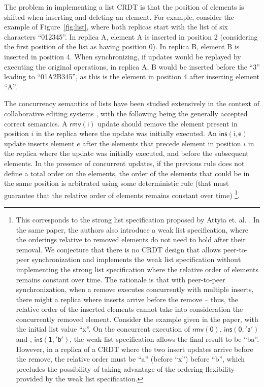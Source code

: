 \documentclass[11pt,a4paper]{article}
\begin{document}
The problem in implementing a list CRDT \cite{Preguica09Commutative,Weiss09Logoot,Roh11Replicated} 
is that the position of elements
is shifted when inserting and deleting an element. For example, consider the example of 
Figure~\ref{fig:list}, where both replicas start with the list of six 
characters ``012345''.
In replica A, element A is inserted in position 2 (considering the first position of 
the list as having position 0).
In replica B, element B is inserted in position 4. 
When synchronizing, if updates would be replayed by executing the original operations, 
in replica A, B would be inserted before the ``3'' leading to ``01A2B345'', as this is 
the element in position 4 after inserting element ``A''. 

The concurrency semantics of lists have been studied extensively in the context of 
collaborative editing systems \cite{Sun98Operational}, with the following being 
the generally accepted correct semantics. 
A $\mathsf{rmv(i)}$ update should remove the element present in position $i$ in 
the replica where the update was initially executed.
An $\mathsf{ins(i,e)}$ update inserts element $e$ after the elements that precede 
element in position $i$ in the replica where the update was initially executed, 
and before the subsequent elements.
In the presence of concurrent updates, if the previous rule does not define a total
order on the elements, the order of the elements that could be in the same position
is arbitrated using some deterministic rule (that must guarantee that the relative 
order of elements remains constant over time) \footnote{This corresponds to the
strong list specification proposed by Attyia et. al. \cite{Attiya16Specification}. 
In the same paper, the authors also introduce a weak list specification, where the 
orderings relative to removed elements do not need to hold after their removal.
We conjecture that there is no CRDT design that allows peer-to-peer synchronization
and implements the weak list specification 
without implementing the strong list specification where the relative order of elements
remains constant over time. The rationale is that with peer-to-peer synchronization, 
when a remove executes concurrently with multiple inserts, there might a replica where
inserts arrive before the remove -- thus, the relative order of the inserted elements
cannot take into consideration the concurrently removed element. Consider the example
given in the paper, with the initial list value ``x''. On the concurrent execution of
$\mathsf{rmv(0)}$, $\mathsf{ins(0,'a')}$ and , $\mathsf{ins(1,'b')}$, the weak list 
specification allows the final result to be ``ba''. However, in a replica of a CRDT 
where the two insert updates arrive before the remove, the relative order must be
``a'' (before ``x'') before ``b'', which precludes the possibility of taking advantage 
of the ordering flexibility provided by the weak list specification.}.
\end{document}
